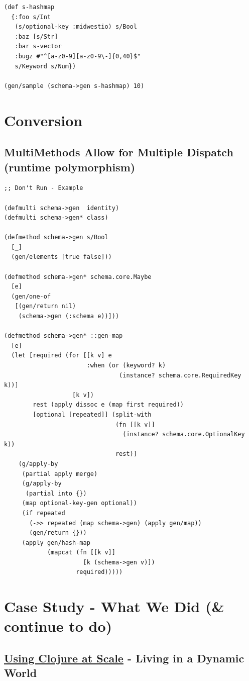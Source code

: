 \documentclass[11pt]{article}
\begin{document}
\begin{verbatim}
(def s-hashmap
  {:foo s/Int
   (s/optional-key :midwestio) s/Bool
   :baz [s/Str]
   :bar s-vector
   :bugz #"^[a-z0-9][a-z0-9\-]{0,40}$"
   s/Keyword s/Num})

(gen/sample (schema->gen s-hashmap) 10)
\end{verbatim}
\section{Conversion}
\label{sec-27}

\subsection{MultiMethods Allow for Multiple Dispatch (runtime polymorphism)}
\label{sec-27-1}

\begin{verbatim}
;; Don't Run - Example

(defmulti schema->gen  identity)
(defmulti schema->gen* class)

(defmethod schema->gen s/Bool
  [_]
  (gen/elements [true false]))

(defmethod schema->gen* schema.core.Maybe
  [e]
  (gen/one-of
   [(gen/return nil)
    (schema->gen (:schema e))]))

(defmethod schema->gen* ::gen-map
  [e]
  (let [required (for [[k v] e
                       :when (or (keyword? k)
                                (instance? schema.core.RequiredKey k))]
                   [k v])
        rest (apply dissoc e (map first required))
        [optional [repeated]] (split-with
                               (fn [[k v]]
                                 (instance? schema.core.OptionalKey k))
                               rest)]
    (g/apply-by
     (partial apply merge)
     (g/apply-by
      (partial into {})
     (map optional-key-gen optional))
     (if repeated
       (->> repeated (map schema->gen) (apply gen/map))
       (gen/return {}))
     (apply gen/hash-map
            (mapcat (fn [[k v]]
                      [k (schema->gen v)])
                    required)))))
\end{verbatim}
\section{Case Study - What We Did (\& continue to do)}
\label{sec-28}

\subsection{\href{http://bit.ly/1r92Jqh}{Using Clojure at Scale} - Living in a Dynamic World}
\label{sec-28-1}
\end{document}
